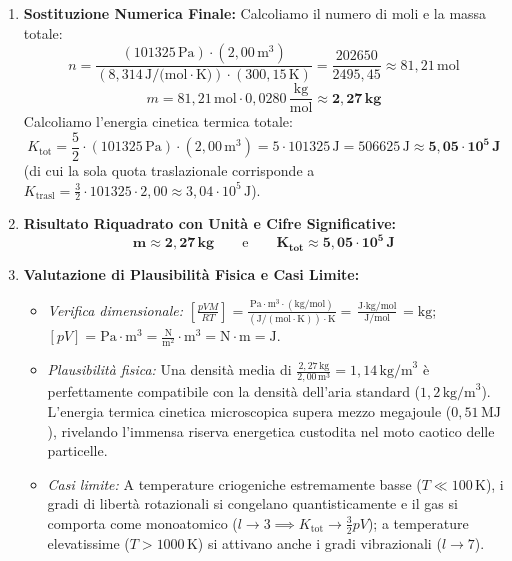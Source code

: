 \documentclass[11pt,a4paper,oneside]{report}
\begin{document}
\begin{problema}
\begin{enumerate}[label=\textbf{Fase \arabic*:}, leftmargin=*, itemsep=5pt]
  \item \textbf{Sostituzione Numerica Finale:}
  Calcoliamo il numero di moli e la massa totale:
  \[
  n = \frac{(101325\,\text{Pa}) \cdot (2{,}00\,\text{m}^3)}{(8{,}314\,\text{J/(mol}\cdot\text{K)}) \cdot (300{,}15\,\text{K})} = \frac{202650}{2495{,}45} \approx 81{,}21\,\text{mol}
  \]
  \[
  m = 81{,}21\,\text{mol} \cdot 0{,}0280\,\frac{\text{kg}}{\text{mol}} \approx \mathbf{2{,}27\,\text{kg}}
  \]
  Calcoliamo l'energia cinetica termica totale:
  \[
  K_{\text{tot}} = \frac{5}{2} \cdot (101325\,\text{Pa}) \cdot (2{,}00\,\text{m}^3) = 5 \cdot 101325\,\text{J} = 506625\,\text{J} \approx \mathbf{5{,}05 \cdot 10^5\,\text{J}}
  \]
  (di cui la sola quota traslazionale corrisponde a $K_{\text{trasl}} = \frac{3}{2} \cdot 101325 \cdot 2{,}00 \approx 3{,}04 \cdot 10^5\,\text{J}$).

  \item \textbf{Risultato Riquadrato con Unit\`a e Cifre Significative:}
  \[
  \mathbf{\boxed{m \approx 2{,}27\,\text{kg}}} \qquad \text{e} \qquad \mathbf{\boxed{K_{\text{tot}} \approx 5{,}05 \cdot 10^5\,\text{J}}}
  \]

  \item \textbf{Valutazione di Plausibilit\`a Fisica e Casi Limite:}
  \begin{itemize}[leftmargin=*, label=\textbullet]
    \item \textit{Verifica dimensionale:} $\left[\frac{p V M}{R T}\right] = \frac{\text{Pa}\cdot\text{m}^3 \cdot (\text{kg/mol})}{(\text{J}/(\text{mol}\cdot\text{K})) \cdot \text{K}} = \frac{\text{J}\cdot\text{kg/mol}}{\text{J/mol}} = \text{kg}$; $[p V] = \text{Pa}\cdot\text{m}^3 = \frac{\text{N}}{\text{m}^2}\cdot\text{m}^3 = \text{N}\cdot\text{m} = \text{J}$.
    \item \textit{Plausibilit\`a fisica:} Una densit\`a media di $\frac{2{,}27\,\text{kg}}{2{,}00\,\text{m}^3} = 1{,}14\,\text{kg/m}^3$ \`e perfettamente compatibile con la densit\`a dell'aria standard ($1{,}2\,\text{kg/m}^3$). L'energia termica cinetica microscopica supera mezzo megajoule ($0{,}51\,\text{MJ}$), rivelando l'immensa riserva energetica custodita nel moto caotico delle particelle.
    \item \textit{Casi limite:} A temperature criogeniche estremamente basse ($T \ll 100\,\text{K}$), i gradi di libert\`a rotazionali si congelano quantisticamente e il gas si comporta come monoatomico ($l \to 3 \implies K_{\text{tot}} \to \frac{3}{2}pV$); a temperature elevatissime ($T > 1000\,\text{K}$) si attivano anche i gradi vibrazionali ($l \to 7$).
  \end{itemize}
\end{enumerate}
\end{problema}
\end{document}
